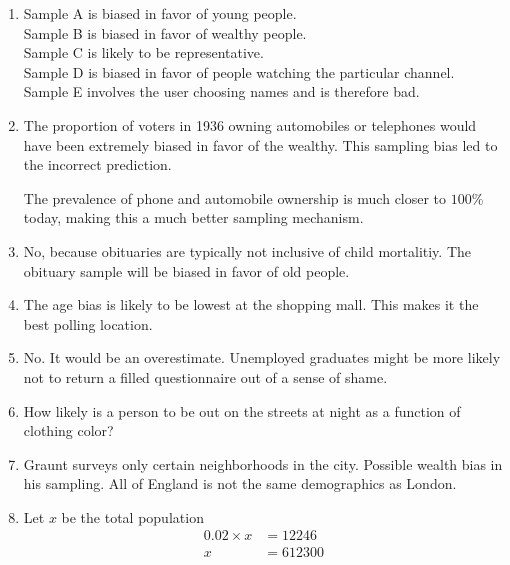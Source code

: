 \begin{enumerate}[leftmargin = \labelsep, label=\textbf{\arabic*.}]
	\item Sample A is biased in favor of young people. \\ Sample B is biased in favor of wealthy people.  \\ Sample C is likely to be representative. \\ Sample D is biased in favor of people watching the particular channel. \\ Sample E involves the user choosing names and is therefore bad.
	
	\item The proportion of voters in 1936 owning automobiles or telephones would have been extremely biased in favor of the wealthy. This sampling bias led to the incorrect prediction.
	
	The prevalence of phone and automobile ownership is much closer to $ 100 \% $ today, making this a much better sampling mechanism. 
	
	\item No, because obituaries are typically not inclusive of child mortalitiy. The obituary sample will be biased in favor of old people.
		
	\item The age bias is likely to be lowest at the shopping mall. This makes it the best polling location.

	\item No. It would be an overestimate. Unemployed graduates might be more likely not to return a filled questionnaire out of a sense of shame. 

	\item How likely is a person to be out on the streets at night as a function of clothing color? 
	
	\item Graunt surveys only certain neighborhoods in the city. Possible wealth bias in his sampling. All of England is not the same demographics as London.
	
	\item Let $ x $ be the total population \\

	\begin{subequations}
		\begin{align}
			0.02 \times x &= 12246 \\
			x &= 612300
		\end{align}
	\end{subequations}


\end{enumerate}
